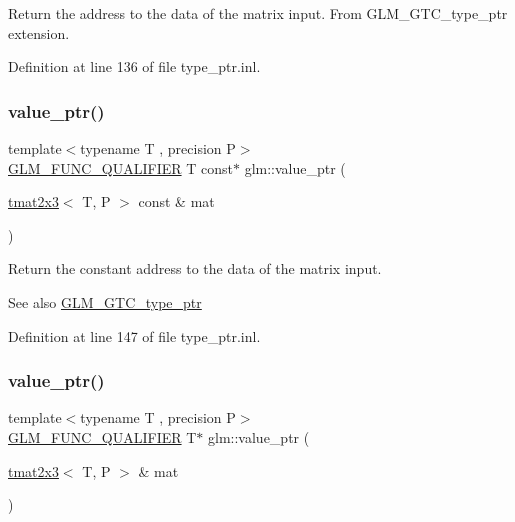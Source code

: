 Return the address to the data of the matrix input. From G\+L\+M\+\_\+\+G\+T\+C\+\_\+type\+\_\+ptr extension. 

Definition at line 136 of file type\+\_\+ptr.\+inl.

\mbox{\label{group__gtc__type__ptr_ga968f2c8899914ea1c1daaaded8daa6b5}} 
\subsubsection{\texorpdfstring{value\_ptr()}{value\_ptr()}\hspace{0.1cm}{\footnotesize\ttfamily [14/27]}}
{\footnotesize\ttfamily template$<$typename T , precision P$>$ \\
\mbox{\hyperlink{setup_8hpp_a33fdea6f91c5f834105f7415e2a64407}{G\+L\+M\+\_\+\+F\+U\+N\+C\+\_\+\+Q\+U\+A\+L\+I\+F\+I\+ER}} T const$\ast$ glm\+::value\+\_\+ptr (\begin{DoxyParamCaption}\item[{\mbox{\hyperlink{structglm_1_1tmat2x3}{tmat2x3}}$<$ T, P $>$ const \&}]{mat }\end{DoxyParamCaption})}

Return the constant address to the data of the matrix input. \begin{DoxySeeAlso}{See also}
\mbox{\hyperlink{group__gtc__type__ptr}{G\+L\+M\+\_\+\+G\+T\+C\+\_\+type\+\_\+ptr}} 
\end{DoxySeeAlso}


Definition at line 147 of file type\+\_\+ptr.\+inl.

\mbox{\label{group__gtc__type__ptr_ga36fb9a17664c8b6848a5d005e4068a2f}} 
\subsubsection{\texorpdfstring{value\_ptr()}{value\_ptr()}\hspace{0.1cm}{\footnotesize\ttfamily [15/27]}}
{\footnotesize\ttfamily template$<$typename T , precision P$>$ \\
\mbox{\hyperlink{setup_8hpp_a33fdea6f91c5f834105f7415e2a64407}{G\+L\+M\+\_\+\+F\+U\+N\+C\+\_\+\+Q\+U\+A\+L\+I\+F\+I\+ER}} T$\ast$ glm\+::value\+\_\+ptr (\begin{DoxyParamCaption}\item[{\mbox{\hyperlink{structglm_1_1tmat2x3}{tmat2x3}}$<$ T, P $>$ \&}]{mat }\end{DoxyParamCaption})}

